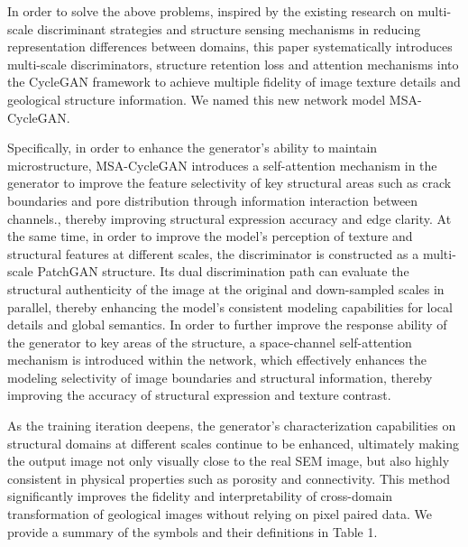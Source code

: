 \documentclass[a4paper,fleqn]{cas-sc}
\begin{document}
In order to solve the above problems, inspired by the existing research on multi-scale discriminant strategies and structure sensing mechanisms in reducing representation differences between domains, this paper systematically introduces multi-scale discriminators, structure retention loss and attention mechanisms into the CycleGAN framework to achieve multiple fidelity of image texture details and geological structure information. We named this new network model MSA-CycleGAN.

Specifically, in order to enhance the generator's ability to maintain microstructure, MSA-CycleGAN introduces a self-attention mechanism in the generator to improve the feature selectivity of key structural areas such as crack boundaries and pore distribution through information interaction between channels., thereby improving structural expression accuracy and edge clarity.
At the same time, in order to improve the model's perception of texture and structural features at different scales, the discriminator is constructed as a multi-scale PatchGAN structure. Its dual discrimination path can evaluate the structural authenticity of the image at the original and down-sampled scales in parallel, thereby enhancing the model's consistent modeling capabilities for local details and global semantics. In order to further improve the response ability of the generator to key areas of the structure, a space-channel self-attention mechanism is introduced within the network, which effectively enhances the modeling selectivity of image boundaries and structural information, thereby improving the accuracy of structural expression and texture contrast.

As the training iteration deepens, the generator's characterization capabilities on structural domains at different scales continue to be enhanced, ultimately making the output image not only visually close to the real SEM image, but also highly consistent in physical properties such as porosity and connectivity. This method significantly improves the fidelity and interpretability of cross-domain transformation of geological images without relying on pixel paired data. We provide a summary of the symbols and their definitions in Table 1. 
\end{document}
